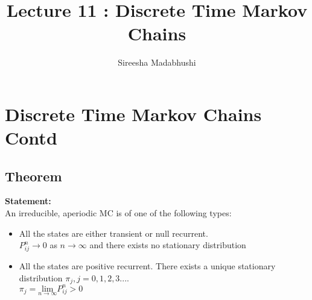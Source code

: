 \documentclass[a4paper,10pt]{article}
\title{Lecture 11 : Discrete Time Markov Chains}
\author{Sireesha Madabhushi}
\theoremstyle{plain}
\theoremstyle{definition}
\theoremstyle{remark}
\begin{document}
\maketitle
\section{Discrete Time Markov Chains Contd}
\subsection{Theorem}
\textbf{Statement:}\\
An irreducible, aperiodic MC is of one of the following types:
\begin{itemize}
	\item All the states are either transient or null recurrent.\\
	$P_{ij}^n \longrightarrow 0$ as $n \longrightarrow \infty$ and there exists no stationary distribution
	\item All the states are positive recurrent. There exists a unique stationary distribution ${\pi_j, j = 0,1,2,3...}$.\\
    $\pi_j = \underset{n\rightarrow \infty}{\text{lim}} P^n_{ij} > 0$
\end{itemize}
\end{document}
